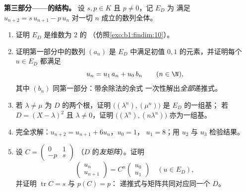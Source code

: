 \begin{problem}
\medskip
\noindent\textbf{第三部分——的结构。}
设 $s, p \in K$ 且 $p \neq 0$，记 $E_D$ 为
满足 $u_{n+2} = s\,u_{n+1} - p\,u_n$ 对一切 $n$ 成立的数列全体。
\begin{enumerate}[resume]
  \item 证明 $E_D$ 是维数为 $2$ 的
        （仿照\cref{exo:b1:findim:10}）。
  \item 证明第一部分中的数列 $(a_n)$ 是
        $E_D$ 中满足初值 $0, 1$ 的元素，并证明每个 $u
        \in E_D$ 都满足
        \[
        u_n = u_1\,a_n + u_0\,b_n \qquad (n \in \N),
        \]
        其中 $(b_n)$ 同第一部分：带余除法的余式
        一次性解出\emph{全部}递推式。
  \item 若 $\lambda \neq \mu$ 为 $D$ 的两个根，证明
        $\bigl((\lambda^n), (\mu^n)\bigr)$ 是 $E_D$ 的一组基；
        若 $D = (X-\lambda)^2$ 且 $\lambda \neq 0$，证明
        $\bigl((\lambda^n), (n\lambda^n)\bigr)$ 亦为一组基。
  \item 完全求解：$u_{n+2} = u_{n+1} + 6u_n$，$u_0 = 1$，
        $u_1 = 8$；用 $u_2$ 与 $u_3$ 检验结果。
  \item 设 $C = \begin{pmatrix} 0 & 1\\ -p & s\end{pmatrix}$
        （$D$ 的\emph{友矩阵}）。证明
        \[
        \begin{pmatrix} u_{n}\\ u_{n+1}\end{pmatrix}
        = C^n \begin{pmatrix} u_0\\ u_1\end{pmatrix}
        \quad (u \in E_D),
        \]
        并证明 $\operatorname{tr} C = s$ 与 $p(C) = p$：
        递推式与矩阵共同对应同一个 $D$。
\end{enumerate}


\end{problem}
